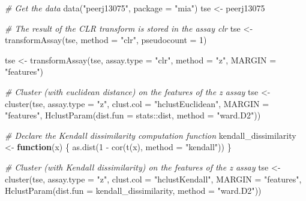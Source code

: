 \documentclass[
]{book}
\newenvironment{Shaded}{\begin{snugshade}}{\end{snugshade}}
\newcommand{\AttributeTok}[1]{\textcolor[rgb]{0.77,0.63,0.00}{#1}}
\newcommand{\CommentTok}[1]{\textcolor[rgb]{0.56,0.35,0.01}{\textit{#1}}}
\newcommand{\ControlFlowTok}[1]{\textcolor[rgb]{0.13,0.29,0.53}{\textbf{#1}}}
\newcommand{\DecValTok}[1]{\textcolor[rgb]{0.00,0.00,0.81}{#1}}
\newcommand{\FunctionTok}[1]{\textcolor[rgb]{0.00,0.00,0.00}{#1}}
\newcommand{\NormalTok}[1]{#1}
\newcommand{\OtherTok}[1]{\textcolor[rgb]{0.56,0.35,0.01}{#1}}
\newcommand{\SpecialCharTok}[1]{\textcolor[rgb]{0.00,0.00,0.00}{#1}}
\newcommand{\StringTok}[1]{\textcolor[rgb]{0.31,0.60,0.02}{#1}}
\begin{document}
\begin{Shaded}
\begin{Highlighting}[]
\CommentTok{\# Get the data}
\FunctionTok{data}\NormalTok{(}\StringTok{"peerj13075"}\NormalTok{, }\AttributeTok{package =} \StringTok{"mia"}\NormalTok{)}
\NormalTok{tse }\OtherTok{\textless{}{-}}\NormalTok{ peerj13075}

\CommentTok{\# The result of the CLR transform is stored in the assay clr}
\NormalTok{tse }\OtherTok{\textless{}{-}} \FunctionTok{transformAssay}\NormalTok{(tse, }\AttributeTok{method =} \StringTok{"clr"}\NormalTok{, }\AttributeTok{pseudocount =} \DecValTok{1}\NormalTok{)}

\NormalTok{tse }\OtherTok{\textless{}{-}} \FunctionTok{transformAssay}\NormalTok{(tse, }\AttributeTok{assay.type =} \StringTok{"clr"}\NormalTok{, }\AttributeTok{method =} \StringTok{"z"}\NormalTok{, }
                      \AttributeTok{MARGIN =} \StringTok{"features"}\NormalTok{)}

\CommentTok{\# Cluster (with euclidean distance) on the features of the z assay}
\NormalTok{tse }\OtherTok{\textless{}{-}} \FunctionTok{cluster}\NormalTok{(tse,}
               \AttributeTok{assay.type =} \StringTok{"z"}\NormalTok{,}
               \AttributeTok{clust.col =} \StringTok{"hclustEuclidean"}\NormalTok{,}
           \AttributeTok{MARGIN =} \StringTok{"features"}\NormalTok{,}
               \FunctionTok{HclustParam}\NormalTok{(}\AttributeTok{dist.fun =}\NormalTok{ stats}\SpecialCharTok{::}\NormalTok{dist, }\AttributeTok{method =} \StringTok{"ward.D2"}\NormalTok{))}

\CommentTok{\# Declare the Kendall dissimilarity computation function}
\NormalTok{kendall\_dissimilarity }\OtherTok{\textless{}{-}} \ControlFlowTok{function}\NormalTok{(x) \{}
    \FunctionTok{as.dist}\NormalTok{(}\DecValTok{1} \SpecialCharTok{{-}} \FunctionTok{cor}\NormalTok{(}\FunctionTok{t}\NormalTok{(x), }\AttributeTok{method =} \StringTok{"kendall"}\NormalTok{))}
\NormalTok{\}}

\CommentTok{\# Cluster (with Kendall dissimilarity) on the features of the z assay}
\NormalTok{tse }\OtherTok{\textless{}{-}} \FunctionTok{cluster}\NormalTok{(tse,}
               \AttributeTok{assay.type =} \StringTok{"z"}\NormalTok{,}
               \AttributeTok{clust.col =} \StringTok{"hclustKendall"}\NormalTok{,}
               \AttributeTok{MARGIN =} \StringTok{"features"}\NormalTok{,            }
               \FunctionTok{HclustParam}\NormalTok{(}\AttributeTok{dist.fun =}\NormalTok{ kendall\_dissimilarity, }\AttributeTok{method =} \StringTok{"ward.D2"}\NormalTok{))}
\end{Highlighting}
\end{Shaded}
\end{document}
